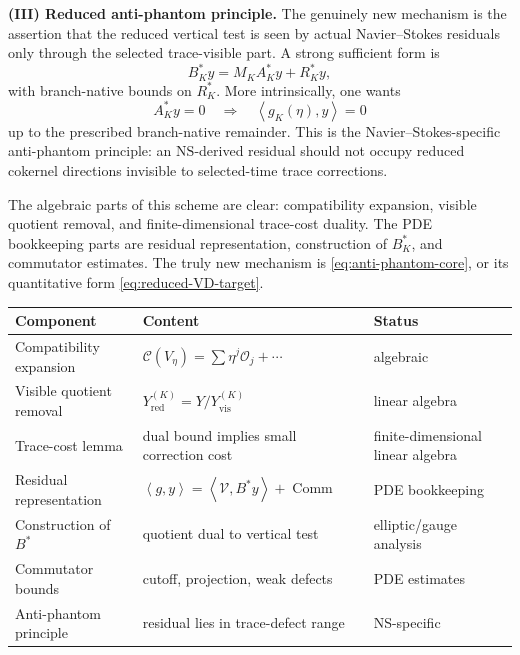 \documentclass[11pt]{article}
\numberwithin{equation}{section}
\newcommand{\NS}{\mathrm{NS}}
\newcommand{\ip}[2]{\left\langle #1,#2\right\rangle}
\newcommand{\calC}{\mathcal C}
\newcommand{\calO}{\mathcal O}
\newcommand{\calV}{\mathcal V}
\begin{document}
\medskip
\noindent\textbf{(III) Reduced anti-phantom principle.}
The genuinely new mechanism is the assertion that the reduced vertical test is seen by actual Navier--Stokes residuals only through the selected trace-visible part.  A strong sufficient form is
\begin{equation}\label{eq:strong-factorization-obligation}
B_K^*y=M_KA_K^*y+R_K^*y,
\end{equation}
with branch-native bounds on \(R_K^*\).  More intrinsically, one wants
\begin{equation}\label{eq:anti-phantom-core}
A_K^*y=0
\quad\Longrightarrow\quad
\ip{g_K(\eta)}{y}=0
\end{equation}
up to the prescribed branch-native remainder.  This is the Navier--Stokes-specific anti-phantom principle: an \(\NS\)-derived residual should not occupy reduced cokernel directions invisible to selected-time trace corrections.

The algebraic parts of this scheme are clear: compatibility expansion, visible quotient removal, and finite-dimensional trace-cost duality.  The PDE bookkeeping parts are residual representation, construction of \(B_K^*\), and commutator estimates.  The truly new mechanism is \eqref{eq:anti-phantom-core}, or its quantitative form \eqref{eq:reduced-VD-target}.

\begin{center}
\begin{tabularx}{\textwidth}{@{}lXl@{}}
\toprule
Component & Content & Status \\
\midrule
Compatibility expansion & \(\calC(V_\eta)=\sum\eta^j\calO_j+\cdots\) & algebraic \\
Visible quotient removal & \(Y_{\mathrm{red}}^{(K)}=Y/Y_{\mathrm{vis}}^{(K)}\) & linear algebra \\
Trace-cost lemma & dual bound implies small correction cost & finite-dimensional linear algebra \\
Residual representation & \(\ip{g}{y}=\ip{\calV}{B^*y}+\operatorname{Comm}\) & PDE bookkeeping \\
Construction of \(B^*\) & quotient dual to vertical test & elliptic/gauge analysis \\
Commutator bounds & cutoff, projection, weak defects & PDE estimates \\
Anti-phantom principle & residual lies in trace-defect range & NS-specific \\
\bottomrule
\end{tabularx}
\end{center}
\end{document}
